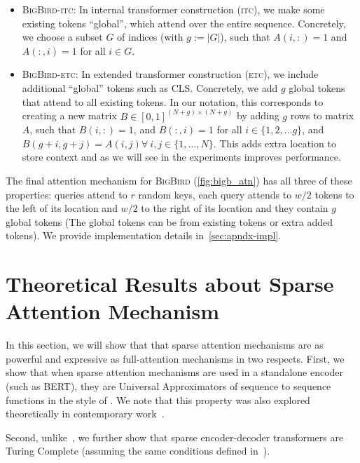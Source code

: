 \begin{itemize}[leftmargin=6mm, itemsep=2mm, partopsep=0pt,parsep=0pt]
    \item \textsc{BigBird}-\textsc{itc}: In internal transformer construction (\textsc{itc}), we make some existing tokens ``global'', which attend over the entire sequence. Concretely, we choose a subset $G$ of indices (with $g:=|G|$), such that $A(i, :) = 1$ and $A(:,i) =1$ for all $i \in G$. 
    \item \textsc{BigBird}-\textsc{etc}: In extended transformer construction (\textsc{etc}), we include additional ``global'' tokens such as CLS. Concretely, we add $g$ global tokens that attend to all existing tokens. In our notation, this corresponds to creating a new matrix $B \in [0, 1]^{(N+g)\times (N+g)}$ by adding $g$ rows to matrix $A$, such that $B(i,:) = 1$, and $B(:, i) =1$ for all $i \in \{1,2, \ldots g\}$, and $B(g+i, g+j) = A(i, j) \forall\ i,j \in \{1, \ldots, N \}$. This adds extra location to store context and as we will see in the experiments improves performance.
\end{itemize}

The final attention mechanism for \textsc{BigBird} (\ref{fig:bigb_atn}) has all three of these properties: queries attend to $r$ random keys, each query attends to $w/2$ tokens to the left of its location and $w/2$ to the right of its location and they contain $g$ global tokens (The global tokens can be from existing tokens or extra added tokens). We provide implementation details in~\ref{sec:apndx-impl}.

\section{Theoretical Results about Sparse Attention Mechanism}
\label{sec:theory}

In this section, we will show that that sparse attention mechanisms are as powerful and expressive as full-attention mechanisms in two respects. First, we show that when sparse attention mechanisms are used in a standalone encoder (such as BERT), they are Universal Approximators of sequence to sequence functions in the style of \citet{Yun19}. 
We note that this property was also explored theoretically in contemporary work~\citet{yun2020on}.

Second, unlike~\citep{yun2020on}, we further show that sparse encoder-decoder transformers are Turing Complete (assuming the same conditions defined in~\citep{Perez19}).

